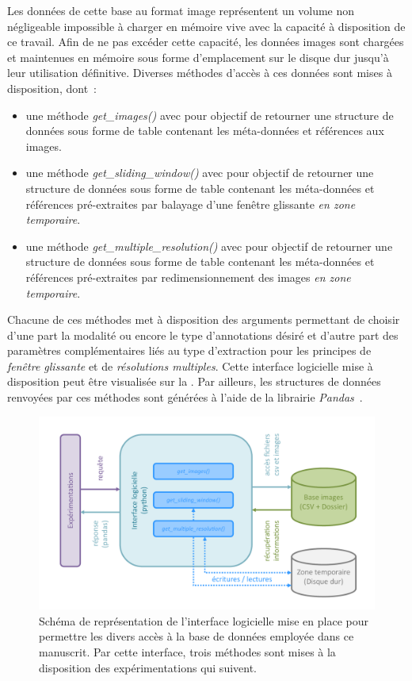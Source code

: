 Les données de cette base au format image représentent un volume non négligeable impossible à charger en mémoire vive avec la capacité à disposition de ce travail. Afin de ne pas excéder cette capacité, les données images sont chargées et maintenues en mémoire sous forme d'emplacement sur le disque dur jusqu'à leur utilisation définitive. Diverses méthodes d'accès à ces données sont mises à disposition, dont~:
\begin{itemize}
    \item une méthode \textit{get\_images()} avec pour objectif de retourner une structure de données sous forme de table contenant les méta-données et références aux images.
    \item une méthode \textit{get\_sliding\_window()} avec pour objectif de retourner une structure de données sous forme de table contenant les méta-données et références pré-extraites par balayage d'une fenêtre glissante \textit{en zone temporaire}.
    \item une méthode \textit{get\_multiple\_resolution()} avec pour objectif de retourner une structure de données sous forme de table contenant les méta-données et références pré-extraites par redimensionnement des images  \textit{en zone temporaire}.
\end{itemize} Chacune de ces méthodes met à disposition des arguments permettant de choisir d'une part la modalité ou encore le type d'annotations désiré et d'autre part des paramètres complémentaires liés au type d'extraction pour les principes de \textit{fenêtre glissante} et de \textit{résolutions multiples}. Cette interface logicielle mise à disposition peut être visualisée sur la . Par ailleurs, les structures de données renvoyées par ces méthodes sont générées à l'aide de la librairie \textit{Pandas}~\cite{Pandas2020}.\par 

\begin{figure}[H]
    \centering
    \includegraphics[width=\linewidth]{contents/chapter_4/resources/schema_database_api.pdf}
    \caption{Schéma de représentation de l'interface logicielle mise en place pour permettre les divers accès à la base de données employée dans ce manuscrit. Par cette interface, trois méthodes sont mises à la disposition des expérimentations qui suivent.}
    \label{fig:schema_database_api}
\end{figure}\par
\clearpage

